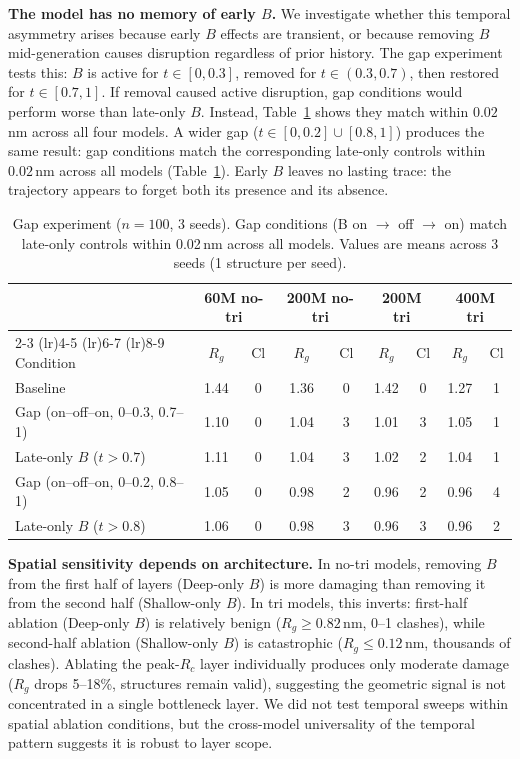 \documentclass{article}
\begin{document}
\textbf{The model has no memory of early $B$.}
We investigate whether this temporal asymmetry arises because early $B$ effects are transient, or because removing $B$ mid-generation causes disruption regardless of prior history.
The gap experiment tests this: $B$ is active for $t \in [0, 0.3]$, removed for $t \in (0.3, 0.7)$, then restored for $t \in [0.7, 1]$.
If removal caused active disruption, gap conditions would perform worse than late-only $B$. Instead, Table~\ref{tab:gap} shows they match within $0.02$\,nm across all four models.
A wider gap ($t \in [0, 0.2] \cup [0.8, 1]$) produces the same result: gap conditions match the corresponding late-only controls within $0.02$\,nm across all models (Table~\ref{tab:gap}).
Early $B$ leaves no lasting trace: the trajectory appears to forget both its presence and its absence.

\begin{table}[h]
    \centering
    \caption{Gap experiment ($n{=}100$, 3 seeds). Gap conditions (B on $\to$ off $\to$ on) match late-only controls within 0.02\,nm across all models. Values are means across 3 seeds (1 structure per seed).}
    \label{tab:gap}
    \begin{tabular}{lcccccccc}
        \toprule
        & \multicolumn{2}{c}{\textbf{60M no-tri}} & \multicolumn{2}{c}{\textbf{200M no-tri}} & \multicolumn{2}{c}{\textbf{200M tri}} & \multicolumn{2}{c}{\textbf{400M tri}} \\
        \cmidrule(lr){2-3} \cmidrule(lr){4-5} \cmidrule(lr){6-7} \cmidrule(lr){8-9}
        Condition & $R_g$ & Cl & $R_g$ & Cl & $R_g$ & Cl & $R_g$ & Cl \\
        \midrule
        Baseline & 1.44 & 0 & 1.36 & 0 & 1.42 & 0 & 1.27 & 1 \\
        Gap (on--off--on, 0--0.3, 0.7--1) & 1.10 & 0 & 1.04 & 3 & 1.01 & 3 & 1.05 & 1 \\
        Late-only $B$ ($t{>}0.7$) & 1.11 & 0 & 1.04 & 3 & 1.02 & 2 & 1.04 & 1 \\
        Gap (on--off--on, 0--0.2, 0.8--1) & 1.05 & 0 & 0.98 & 2 & 0.96 & 2 & 0.96 & 4 \\
        Late-only $B$ ($t{>}0.8$) & 1.06 & 0 & 0.98 & 3 & 0.96 & 3 & 0.96 & 2 \\
        \bottomrule
    \end{tabular}
\end{table}

\textbf{Spatial sensitivity depends on architecture.}
In no-tri models, removing $B$ from the first half of layers (Deep-only $B$) is more damaging than removing it from the second half (Shallow-only $B$).
In tri models, this inverts: first-half ablation (Deep-only $B$) is relatively benign ($R_g \geq 0.82$\,nm, 0--1 clashes), while second-half ablation (Shallow-only $B$) is catastrophic ($R_g \leq 0.12$\,nm, thousands of clashes).
Ablating the peak-$R_c$ layer individually produces only moderate damage ($R_g$ drops 5--18\%, structures remain valid), suggesting the geometric signal is not concentrated in a single bottleneck layer.
We did not test temporal sweeps within spatial ablation conditions, but the cross-model universality of the temporal pattern suggests it is robust to layer scope.
\end{document}

